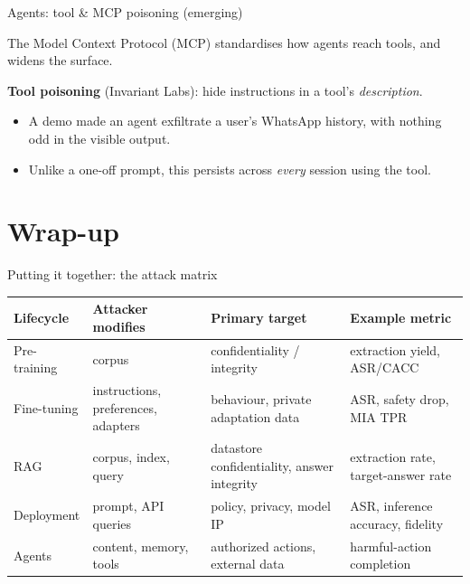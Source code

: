 \documentclass[12pt,aspectratio=169,handout]{beamer}
\begin{document}
\begin{frame}{Agents: tool \& MCP poisoning (emerging)}
The Model Context Protocol (MCP) standardises how agents reach tools, and widens the surface.

\vspace{0.3em}
\textbf{Tool poisoning} (Invariant Labs): hide instructions in a tool's \emph{description}.
\begin{itemize}
	\item A demo made an agent exfiltrate a user's WhatsApp history, with nothing odd in the visible output.
	\item Unlike a one-off prompt, this persists across \emph{every} session using the tool.
\end{itemize}

\end{frame}


\section{Wrap-up}

\begin{frame}{Putting it together: the attack matrix}
\begin{center}\scriptsize
\begin{tabular}{@{}p{1.8cm} p{3.1cm} p{2.7cm} p{3.0cm}@{}}
	\textbf{Lifecycle} & \textbf{Attacker modifies} & \textbf{Primary target} & \textbf{Example metric}\\
	\hline
	Pre-training & corpus & confidentiality / integrity & extraction yield, ASR/CACC\\
	Fine-tuning & instructions, preferences, adapters & behaviour, private adaptation data & ASR, safety drop, MIA TPR\\
	RAG & corpus, index, query & datastore confidentiality, answer integrity & extraction rate, target-answer rate\\
	Deployment & prompt, API queries & policy, privacy, model IP & ASR, inference accuracy, fidelity\\
	Agents & content, memory, tools & authorized actions, external data & harmful-action completion\\
\end{tabular}
\end{center}

\end{frame}
\end{document}
